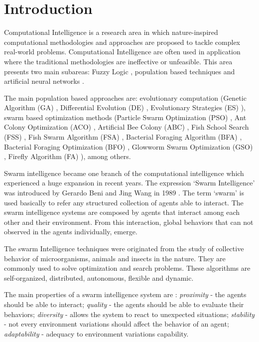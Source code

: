 \chapter{Introduction}\label{cap:introduction}
Computational Intelligence is a research area in which nature-inspired
computational methodologies and approaches are proposed to tackle
complex real-world problems. Computational Intelligence are often used in application where the traditional methodologies are
ineffective or unfeasible. This area presents two main subareas: Fuzzy Logic
\cite{Fuzzy:Ziimermann2001}, population based techniques and artificial neural networks \cite{NN:Rumelhart1987}.

The main population based approaches are: evolutionary computation (Genetic
Algorithm (GA) \cite{GA:Mitchell1998} \cite{GA:Guo2008}, Differential Evolution
(DE) \cite{DE:Gao2010} \cite{DE:Prince2005}, Evolutionary Strategies (ES)
\cite{ES:Beyer2001a} \cite{ES:Beyer2001b}), swarm based optimization
methods (Particle Swarm Optimization (PSO) \cite{PSO:Eberhart1995}
\cite{PSO:Eberhart1995a}, Ant Colony Optimization (ACO) \cite{ACO:Dorigo1999}
\cite{ACO:Dorigo2005}, Artificial Bee Colony (ABC) \cite{ABC:Karaboga2005}
\cite{ABC:Karaboga2006}, Fish School Search (FSS) \cite{FSS:Bastos-Filho2008},
Fish Swarm Algorithm (FSA) \cite{FSA:Yazdani2012}, Bacterial Foraging Algorithm
(BFA) \cite{BFA:Muller2002}, Bacterial Foraging Optimization (BFO)
\cite{BFO:Das2009}, Glowworm Swarm Optimization (GSO)
\cite{GSO:Krishnanand2009}, Firefly Algorithm (FA) \cite{FA:Yang2009}), among
others.

Swarm intelligence became one branch of the computational intelligence which experienced a huge expansion in recent years. The expression
`Swarm Intelligence' was introduced by Gerardo Beni and Jing Wang
in 1989 \cite{SI:Beni1989}. The term `swarm' is used basically to refer any
structured collection of agents able to interact. The swarm intelligence systems
are composed by agents that interact among each other and their environment. From this
interaction, global behaviors that can not observed in the agents
individually, emerge.

The swarm Intelligence techniques were originated from the study of collective
behavior of microorganisms, animals and insects in the nature. They are
commonly used to solve optimization and search problems. These algorithms are
self-organized, distributed, autonomous, flexible and dynamic.

The main properties of a swarm intelligence system are \cite{SI:Serapiao2009}:
\emph{proximity} - the agents should be able to interact; \emph{quality} - the
agents should be able to evaluate their behaviors; \emph{diversity} - allows
the system to react to unexpected situations; \emph{stability} - not every
environment variations should affect the behavior of an agent;
\emph{adaptability} - adequacy to environment variations capability.

